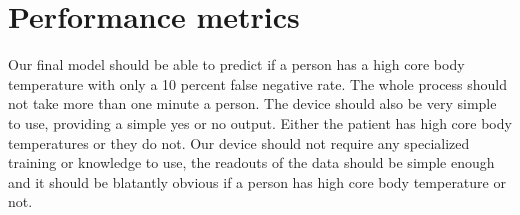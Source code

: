 \documentclass{article}
\begin{document}
\section{Performance metrics}

Our final model should be able to predict if a person has a high core body temperature with only a 10 percent false negative rate. The whole process should not take more than one minute a person. The device should also be very simple to use, providing a simple yes or no output. Either the patient has high core body temperatures or they do not. Our device should not require any specialized training or knowledge to use, the readouts of the data should be simple enough and it should be blatantly obvious if a person has high core body temperature or not.

 
\end{document}
